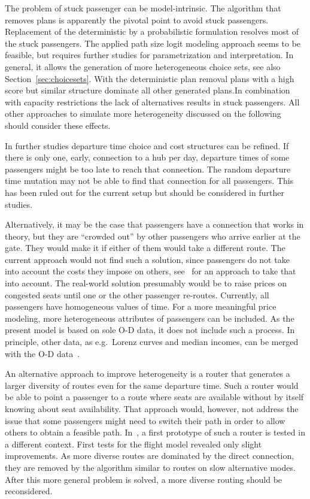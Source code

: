 The problem of stuck passenger can be model-intrinsic. 
The algorithm that removes plans is apparently the pivotal point to avoid stuck passengers. 
Replacement of the deterministic by a probabilistic formulation resolves most of the stuck passengers. 
The applied path size logit modeling approach seems to be feasible, but requires further studies for parametrization and interpretation. 
In general, it allows the generation of more heterogeneous choice sets, see also Section~\ref{sec:choicesets}. 
With the deterministic plan removal plans with a high score but similar structure dominate all other generated plans.In combination with capacity restrictions the lack of alternatives results in stuck passengers.  
All other approaches to simulate more heterogeneity discussed on the following should consider these effects.  

In further studies departure time choice and cost structures can be refined. 
If there is only one, early, connection to a hub per day, departure times of some passengers might be too late to reach that connection. 
The random departure time mutation may not be able to find that connection for all passengers. 
This has been ruled out for the current setup but should be considered in further studies. 

Alternatively, it may be the case that passengers have a connection that works in theory, but they are ``crowded out'' by other passengers who arrive earlier at the gate.  
They would make it if either of them would take a different route.  
The current approach would not find such a solution, since passengers do not take into account the costs they impose on others, see~\citet{LaemmelFloetteroed2009KISysOptEvac} for an approach to take that into account.  
The real-world solution presumably would be to raise prices on congested seats until one or the other passenger re-routes. 
Currently, all passengers have homogeneous values of time.   
For a more meaningful price modeling, more heterogeneous attributes of passengers can be included. 
As the present model is based on sole O-D data, it does not include such a process. 
In principle, other data, as e.g.~Lorenz curves and median incomes, can be merged with the O-D data~\citep{KickhoeferEtAl2011PolicyEvaluationIncome}.  

An alternative approach to improve heterogeneity is a router that generates a larger diversity of routes even for the same departure time.  
Such a router would be able to point a passenger to a route where seats are available without by itself knowing about seat availability.  
That approach would, however, not address the issue that some passengers might need to switch their path in order to allow others to obtain a feasible path. 
In~\citet{Graf2013Da}, a first prototype of such a router is tested in a different context. 
First tests for the flight model revealed only slight improvements. 
As more diverse routes are dominated by the direct connection, they are removed by the algorithm similar to routes on slow alternative modes. 
After this more general problem is solved, a more diverse routing should be reconsidered. 

